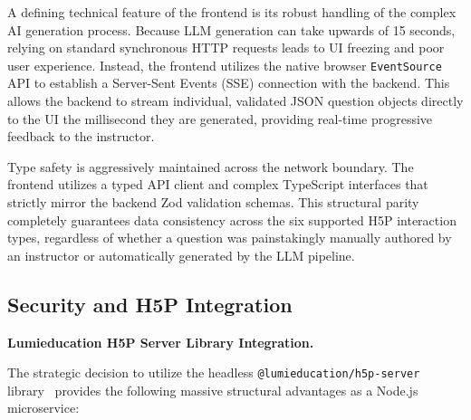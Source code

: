 A defining technical feature of the frontend is its robust handling of the complex AI generation process. Because LLM generation can take upwards of 15 seconds, relying on standard synchronous HTTP requests leads to UI freezing and poor user experience. Instead, the frontend utilizes the native browser \texttt{EventSource} API to establish a Server-Sent Events (SSE) connection with the backend. This allows the backend to stream individual, validated JSON question objects directly to the UI the millisecond they are generated, providing real-time progressive feedback to the instructor.

Type safety is aggressively maintained across the network boundary. The frontend utilizes a typed API client and complex TypeScript interfaces that strictly mirror the backend Zod validation schemas. This structural parity completely guarantees data consistency across the six supported H5P interaction types, regardless of whether a question was painstakingly manually authored by an instructor or automatically generated by the LLM pipeline.

\subsection{Security and H5P Integration}

\textbf{Lumieducation H5P Server Library Integration.}

The strategic decision to utilize the headless \texttt{@lumieducation/h5p-server} library~\cite{lumieducation2023} provides the following massive structural advantages as a Node.js microservice:

